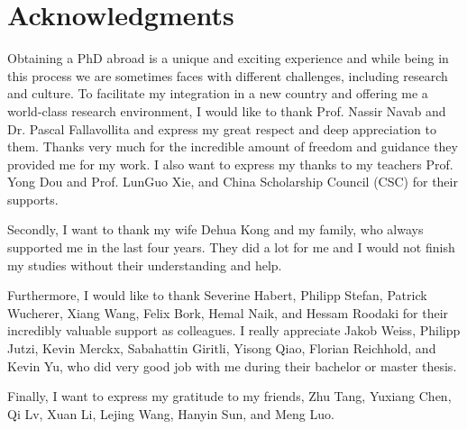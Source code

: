 %
\chapter*{Acknowledgments}
\label{sec:acknowledgement}

Obtaining a PhD abroad is a unique and exciting experience and while being in this process we are sometimes faces with different challenges, including research and culture. To facilitate my integration in a new country and offering me a world-class research environment, I would like to thank Prof. Nassir Navab and Dr. Pascal Fallavollita and express my great respect and deep appreciation to them. Thanks very much for the incredible amount of freedom and guidance they provided me for my work. I also want to express my thanks to my teachers Prof. Yong Dou and Prof. LunGuo Xie, and China Scholarship Council (CSC) for their supports. 

Secondly, I want to thank my wife Dehua Kong and my family, who always supported me in the last four years. They did a lot for me and I would not finish my studies without their understanding and help.

Furthermore, I would like to thank Severine Habert, Philipp Stefan, Patrick Wucherer, Xiang Wang, Felix Bork, Hemal Naik, and Hessam Roodaki for their incredibly valuable support as colleagues. I really appreciate Jakob Weiss, Philipp Jutzi, Kevin Merckx, Sabahattin Giritli, Yisong Qiao, Florian Reichhold, and Kevin Yu, who did very good job with me during their bachelor or master thesis.

Finally, I want to express my gratitude to my friends, Zhu Tang, Yuxiang Chen, Qi Lv, Xuan Li, Lejing Wang, Hanyin Sun, and Meng Luo.


